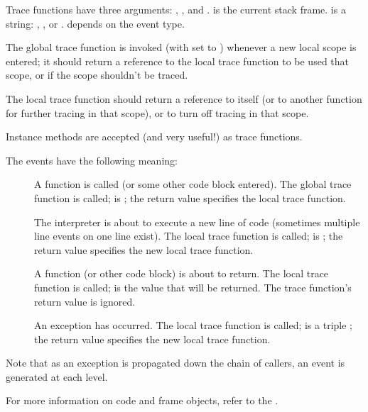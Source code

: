 Trace functions have three arguments: , , and
.  is the current stack frame.   is a
string: , ,  or
.   depends on the event type.

The global trace function is invoked (with  set to
) whenever a new local scope is entered; it should return
a reference to the local trace function to be used that scope, or
 if the scope shouldn't be traced.

The local trace function should return a reference to itself (or to
another function for further tracing in that scope), or  to
turn off tracing in that scope.

Instance methods are accepted (and very useful!) as trace functions.

The events have the following meaning:

\begin{description}

\item[]
A function is called (or some other code block entered).  The global
trace function is called;  is ;
the return value specifies the local trace function.

\item[]
The interpreter is about to execute a new line of code (sometimes
multiple line events on one line exist).  The local trace function is
called;  is ; the return value specifies the new
local trace function.

\item[]
A function (or other code block) is about to return.  The local trace
function is called;  is the value that will be returned.  The
trace function's return value is ignored.

\item[]
An exception has occurred.  The local trace function is called;
 is a triple ; the return value specifies the new local trace
function.

\end{description}

Note that as an exception is propagated down the chain of callers, an
 event is generated at each level.

For more information on code and frame objects, refer to the
.
